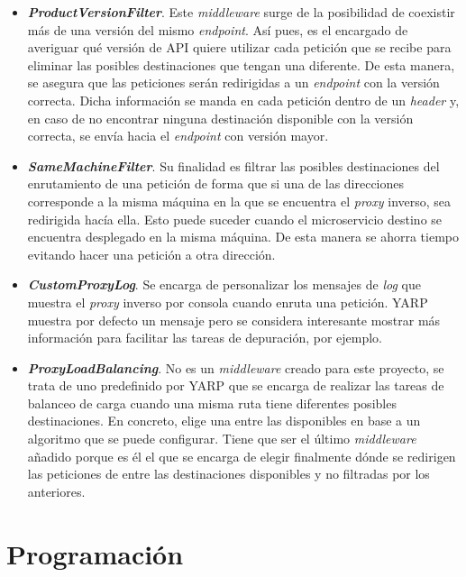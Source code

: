 \documentclass[11pt,spanish,listoffigures]{tfgetsinf}
\begin{document}
\begin{itemize}

	\item \textbf{\emph{ProductVersionFilter}}. Este \emph{middleware} surge de la posibilidad de coexistir más de una versión del mismo \emph{endpoint}. Así pues, es el encargado de averiguar qué versión de API quiere utilizar cada petición que se recibe para eliminar las posibles destinaciones que tengan una diferente. De esta manera, se asegura que las peticiones serán redirigidas a un \emph{endpoint} con la versión correcta. Dicha información se manda en cada petición dentro de un \emph{header} y, en caso de no encontrar ninguna destinación disponible con la versión correcta, se envía hacia el \emph{endpoint} con versión mayor.

	\item \textbf{\emph{SameMachineFilter}}. Su finalidad es filtrar las posibles destinaciones del enrutamiento de una petición de forma que si una de las direcciones corresponde a la misma máquina en la que se encuentra el \emph{proxy} inverso, sea redirigida hacía ella. Esto puede suceder cuando el microservicio destino se encuentra desplegado en la misma máquina. De esta manera se ahorra tiempo evitando hacer una petición a otra dirección.

	\item \textbf{\emph{CustomProxyLog}}. Se encarga de personalizar los mensajes de \emph{log} que muestra el \emph{proxy} inverso por consola cuando enruta una petición. YARP muestra por defecto un mensaje pero se considera interesante mostrar más información para facilitar las tareas de depuración, por ejemplo.

	\item \textbf{\emph{ProxyLoadBalancing}}. No es un \emph{middleware} creado para este proyecto, se trata de uno predefinido por YARP que se encarga de realizar las tareas de balanceo de carga cuando una misma ruta tiene diferentes posibles destinaciones. En concreto, elige una entre las disponibles en base a un algoritmo que se puede configurar. Tiene que ser el último \emph{middleware} añadido porque es él el que se encarga de elegir finalmente dónde se redirigen las peticiones de entre las destinaciones disponibles y no filtradas por los anteriores.

\end{itemize}


	\section{Programación} \label{programacion}
\end{document}
